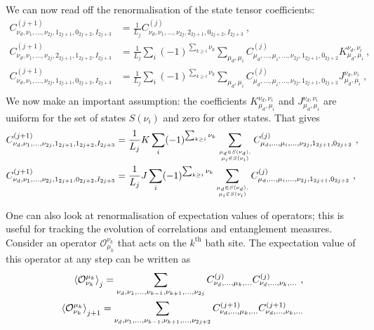 We can now read off the renormalisation of the state tensor coefficients:
\begin{equation}\begin{aligned}
	C^{(j+1)}_{\nu_d, \nu_1,\ldots,\nu_{2j}, 1_{2j+1}, 0_{2j+2}, I_{2j+3}} &= \frac{1}{L_j}C^{(j)}_{\nu_d, \nu_1,\ldots,\nu_{2j}, 2_{2j+1}, 0_{2j+2}, I_{2j+3}}~,\\
	C^{(j+1)}_{\nu_d, \nu_1,\ldots,\nu_{2j}, 2_{2j+1}, 1_{2j+2}, I_{2j+3}} &= \frac{1}{L_j}\sum_{i}(-1)^{\sum_{k\geq i}\nu_k}\sum_{\mu_d,\mu_i}C^{(j)}_{\mu_d,\ldots,\mu_i,\ldots,\nu_{2j},1_{2j+1},0_{2j+2}}K^{\nu_d,\nu_i}_{\mu_d,\mu_i}~,\\
	C^{(j+1)}_{\nu_d, \nu_1,\ldots,\nu_{2j}, 1_{2j+1}, 0_{2j+2}, I_{2j+3}} &= \frac{1}{L_j}\sum_{i}(-1)^{\sum_{k\geq i}\nu_k}\sum_{\mu_d,\mu_i}C^{(j)}_{\mu_d,\ldots,\mu_i,\ldots,\nu_{2j},1_{2j+1},0_{2j+2}}J^{\nu_d,\nu_i}_{\mu_d,\mu_i}~,\\
\end{aligned}\end{equation}
We now make an important assumption: the coefficients \(K^{\nu_d,\nu_i}_{\mu_d,\mu_i}\) and \(J^{\nu_d,\nu_i}_{\mu_d,\mu_i}\) are uniform for the set of states \(S(\nu_i)\) and zero for other states. That gives
\begin{equation}\begin{aligned}
	C^{(j+1)}_{\nu_d, \nu_1,\ldots,\nu_{2j}, 1_{2j+1}, 1_{2j+2}, I_{2j+3}} &= \frac{1}{L_j}K\sum_{i}(-1)^{\sum_{k\geq i}\nu_k}\sum_{\mu_d \in S(\nu_d),\atop{\mu_i \in S(\nu_i)}}C^{(j)}_{\mu_d,\ldots,\mu_i,\ldots,\nu_{2j},1_{2j+1},0_{2j+2}}~,\\
	C^{(j+1)}_{\nu_d, \nu_1,\ldots,\nu_{2j}, 1_{2j+1}, 0_{2j+2}, I_{2j+3}} &= \frac{1}{L_j}J\sum_{i}(-1)^{\sum_{k\geq i}\nu_k}\sum_{\mu_d \in S(\nu_d),\atop{\mu_i \in S(\nu_i)}}C^{(j)}_{\mu_d,\ldots,\mu_i,\ldots,\nu_{2j},1_{2j+1},0_{2j+2}}~,\\
\end{aligned}\end{equation}

One can also look at renormalisation of expectation values of operators; this is useful for tracking the evolution of correlations and entanglement measures. Consider an operator \(\mathcal{O}_{\mu_k}^{\nu_k}\) that acts on the \(k^\text{th}\) bath site. The expectation value of this operator at any step can be written as
\begin{equation}\begin{aligned}
	\braket{\mathcal{O}_{\nu_k}^{\mu_k}}_{j} = \sum_{\nu_d,\nu_1,\ldots,\nu_{k-1},\nu_{k+1},\ldots,\nu_{2j}}C^{(j)}_{\nu_d,\ldots,\mu_k,\ldots}C^{(j)}_{\nu_d,\ldots,\nu_k,\ldots}~,\\
	\braket{\mathcal{O}_{\nu_k}^{\mu_k}}_{j+1} = \sum_{\nu_d,\nu_1,\ldots,\nu_{k-1},\nu_{k+1},\ldots,\nu_{2j+2}}C^{(j+1)}_{\nu_d,\ldots,\mu_k,\ldots}C^{(j+1)}_{\nu_d,\ldots,\nu_k,\ldots}
\end{aligned}\end{equation}

